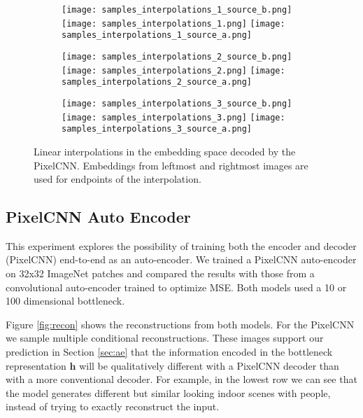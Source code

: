 \documentclass{article}
\renewcommand{\vec}{\mathbf}
\begin{document}
\begin{figure*}[p]

\begin{subfigure}{0.98\textwidth}
  \centering
  \hfill
  \texttt{[image: samples\_interpolations\_1\_source\_b.png]}
  \hfill
  \texttt{[image: samples\_interpolations\_1.png]}
  \hfill
  \texttt{[image: samples\_interpolations\_1\_source\_a.png]}
  \hfill
\end{subfigure}

\begin{subfigure}{0.98\textwidth}
  \centering
  \hfill
  \texttt{[image: samples\_interpolations\_2\_source\_b.png]}
  \hfill
  \texttt{[image: samples\_interpolations\_2.png]}
  \hfill
  \texttt{[image: samples\_interpolations\_2\_source\_a.png]}
  \hfill
\end{subfigure}

\begin{subfigure}{0.98\textwidth}
  \centering
  \hfill
  \texttt{[image: samples\_interpolations\_3\_source\_b.png]}
  \hfill
  \texttt{[image: samples\_interpolations\_3.png]}
  \hfill
  \texttt{[image: samples\_interpolations\_3\_source\_a.png]}
  \hfill
\end{subfigure}

\caption{Linear interpolations in the embedding space decoded by the PixelCNN. Embeddings from leftmost and rightmost images are used for endpoints of the interpolation.}
\label{fig:transitions}

\end{figure*}


\subsection{PixelCNN Auto Encoder}

This experiment explores the possibility of training both the encoder and decoder (PixelCNN) end-to-end as an auto-encoder. We trained a PixelCNN auto-encoder on 32x32 ImageNet patches and compared the results with those from a convolutional auto-encoder trained to optimize MSE. Both models used a 10 or 100 dimensional bottleneck. 

Figure \ref{fig:recon} shows the reconstructions from both models. For the PixelCNN we sample multiple conditional reconstructions. 
These images support our prediction in Section \ref{sec:ae} that the information encoded in the bottleneck representation $\vec{h}$ will be qualitatively different with a PixelCNN decoder than with a more conventional decoder.
For example, in the lowest row we can see that the model generates different but similar looking indoor scenes with people, instead of trying to exactly reconstruct the input.
\end{document}

